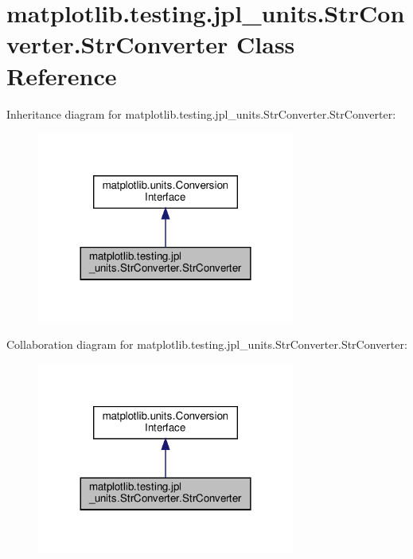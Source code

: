 \hypertarget{classmatplotlib_1_1testing_1_1jpl__units_1_1StrConverter_1_1StrConverter}{}\section{matplotlib.\+testing.\+jpl\+\_\+units.\+Str\+Converter.\+Str\+Converter Class Reference}
\label{classmatplotlib_1_1testing_1_1jpl__units_1_1StrConverter_1_1StrConverter}


Inheritance diagram for matplotlib.\+testing.\+jpl\+\_\+units.\+Str\+Converter.\+Str\+Converter\+:
\nopagebreak
\begin{figure}[H]
\begin{center}
\leavevmode
\includegraphics[width=240pt]{classmatplotlib_1_1testing_1_1jpl__units_1_1StrConverter_1_1StrConverter__inherit__graph}
\end{center}
\end{figure}


Collaboration diagram for matplotlib.\+testing.\+jpl\+\_\+units.\+Str\+Converter.\+Str\+Converter\+:
\nopagebreak
\begin{figure}[H]
\begin{center}
\leavevmode
\includegraphics[width=240pt]{classmatplotlib_1_1testing_1_1jpl__units_1_1StrConverter_1_1StrConverter__coll__graph}
\end{center}
\end{figure}
